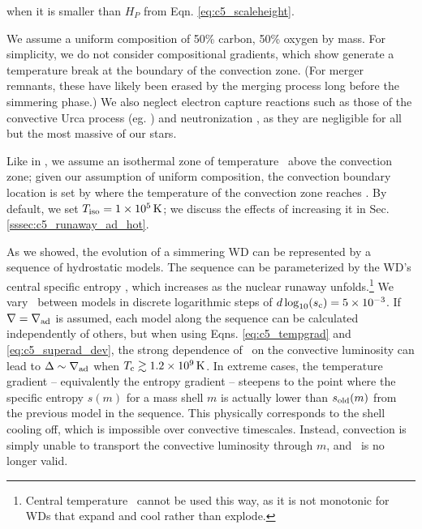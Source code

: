 \noindent when it is smaller than $H_P$ from Eqn. \ref{eq:c5_scaleheight}.

We assume a uniform composition of 50\% carbon, 50\% oxygen by mass.  For simplicity, we do not consider compositional gradients, which \citeal{piroc08} show generate a temperature break at the boundary of the convection zone.  (For merger remnants, these have likely been erased by the merging process long before the simmering phase.)  We also neglect electron capture reactions such as those of the convective Urca process (eg. \citealt{steiw06}) and neutronization \citep{pirob08}, as they are negligible for all but the most massive of our stars.  


Like in \citeal{piroc08}, we assume an isothermal zone of temperature \tempiso\ above the convection zone; given our assumption of uniform composition, the convection boundary location is set by where the temperature of the convection zone reaches \tempiso.  By default, we set $\tempiso = 1\times10^5\,\mrm{K}$; we discuss the effects of increasing it in Sec. \ref{sssec:c5_runaway_ad_hot}.

As we showed, the evolution of a simmering WD can be represented by a sequence of hydrostatic models.  The sequence can be parameterized by the WD's central specific entropy \Sc, which increases as the nuclear runaway unfolds.\footnote{Central temperature \Tc\ cannot be used this way, as it is not monotonic for WDs that expand and cool rather than explode.}  We vary \Sc\ between models in discrete logarithmic steps of $d\log_{10}(\Sc) = 5 \times 10^{-3}$.  If $\nabla = \nablaad$ is assumed, each model along the sequence can be calculated independently of others, but when using Eqns. \ref{eq:c5_tempgrad} and \ref{eq:c5_superad_dev}, the strong dependence of \vconv\ on the convective luminosity can lead to $\deltanab \sim \nablaad$ when $\Tc \gtrsim 1.2\times10^9\,\mrm{K}$.  In extreme cases, the temperature gradient -- equivalently the entropy gradient -- steepens to the point where the specific entropy $s(m)$ for a mass shell $m$ is actually lower than $s_\mathrm{old}(m)$ from the previous model in the sequence.  This physically corresponds to the shell cooling off, which is impossible over convective timescales.  Instead, convection is simply unable to transport the convective luminosity through $m$, and \deltanab\ is no longer valid.


